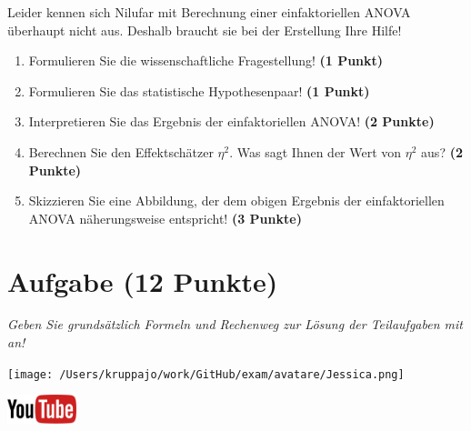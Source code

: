 \documentclass[a4paper, 9pt]{scrartcl}\usepackage[]{graphicx}\usepackage[]{xcolor}
\begin{document}
\vspace{1ex}

Leider kennen sich Nilufar mit Berechnung einer einfaktoriellen ANOVA überhaupt nicht aus. Deshalb braucht sie bei der Erstellung Ihre Hilfe! 

\begin{enumerate}
  \item Formulieren Sie die wissenschaftliche Fragestellung! \textbf{(1 Punkt)}
  \item Formulieren Sie das statistische Hypothesenpaar! \textbf{(1 Punkt)}
\item Interpretieren Sie das Ergebnis der einfaktoriellen ANOVA! \textbf{(2 Punkte)} 
\item Berechnen Sie den Effektschätzer $\eta^2$. Was sagt Ihnen der Wert von $\eta^2$ aus? \textbf{(2 Punkte)}
\item Skizzieren Sie eine Abbildung, der dem obigen Ergebnis der
  einfaktoriellen ANOVA näherungsweise entspricht! \textbf{(3 Punkte)}
\end{enumerate}

 
\clearpage

\section{Aufgabe \hfill (12 Punkte)}

\textit{Geben Sie grundsätzlich Formeln und Rechenweg zur Lösung der Teilaufgaben mit an!} \\[1Ex]
 

 
\begin{minipage}[t]{0.5\textwidth}
\texttt{[image: /Users/kruppajo/work/GitHub/exam/avatare/Jessica.png]}
\end{minipage}
\begin{minipage}[t]{0.5\textwidth}
\hfill
\href{https://youtu.be/8Pb2sKUIMyk}{\includegraphics[width = 2cm]{img/youtube}}\\[1Ex]
\end{minipage}
\vspace{1ex}
\end{document}
